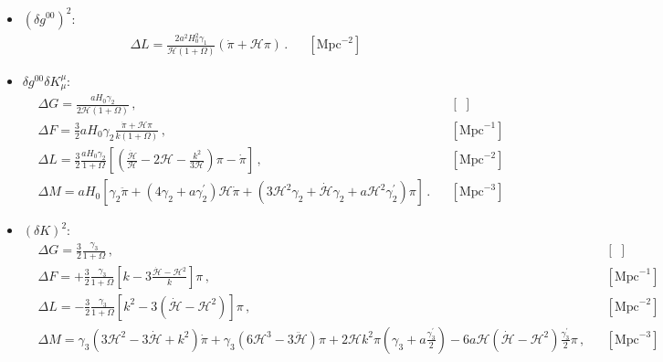 \documentclass[prd,nofootinbib,showpacs]{revtex4}
\def\l{\left}
\def\r{\right}
\def\f{\frac}
\def\hub{{\mathcal H}}
\begin{document}
{\begin{itemize}
{\begin{align}
%
\Delta X=&1 \,, \hspace{1cm} \Delta \dot{X}=0  \, , & & [\,\, , \,\,] \, \nonumber \\
%
\Delta Y=&  \frac{a\Omega^\prime}{2(1+\Omega)}  \, , & & [\,\, ] \, \nonumber \\
%
\Delta U=&1, \, & & [\,\, ] \, \nonumber \\
%
\Delta V=&\f{1}{2}\f{a\Omega'}{1+\Omega} \,, \hspace{1cm} \Delta \dot{V}=\f{a\hub}{2(1+\Omega)}\l[\Omega' +a\Omega'' -\f{a\Omega'^{\,2}}{1+\Omega} \r] \, . & & [\,\, , \text{Mpc}^{-1}] \,
\end{align}}
%
\item[] \underline{$(\delta g^{00})^2$}:\\
{\small
\begin{align}\label{Eq:ContribGamma1}
& \Delta {{ L}}= \f{2a^2H_0^2\gamma_1}{\hub \l(1 + \Omega \r)}\l(\dot{\pi}+\hub\pi\r)\, .& & [\text{Mpc}^{-2}] \,
\end{align}}
%
\item[] 
\underline{$\delta g^{00}\delta K^\mu_\mu$}:
{\small
\begin{align} \label{Eq:ContribGamma2}
&\Delta{ G}=\f{a H_0 \gamma_2}{2\hub(1+\Omega)} \, , & & [\,\,] \,\nonumber \\
%
&\Delta{ F}=\f{3}{2}aH_0\gamma_2\f{\dot{\pi}+\hub\pi}{k(1+\Omega)}\, , & &  [\text{Mpc}^{-1}] \,\nonumber\\
%
&\Delta{ L}=\f{3}{2} \f{a H_0\gamma_2}{1+\Omega}\left[\l(\f{\dot{\hub}}{\hub}-2\hub-\f{k^2}{3\hub}\r)\pi-\dot{\pi}\r] \, ,& &  [\text{Mpc}^{-2}] \,\nonumber\\
%
&\Delta{ M}= aH_0\l[\gamma_2\ddot{\pi}+\l(4\gamma_2+a\gamma_2^\prime\r)\hub\dot{\pi}+\l(3\hub^2\gamma_2+\dot{\hub}\gamma_2+a\hub^2\gamma_2^\prime\r)\pi\r]\, . & &  [\text{Mpc}^{-3}] \,
\end{align}}
%
\item[] \underline{$(\delta K)^2$}:\\
{\small
\begin{align} \label{Eq:ContribGamma3}
%
&\Delta{ G}=\f{3}{2}\f{\gamma_3}{1+\Omega}\, , & &  [\,\,]  \,\nonumber \\
%
&\Delta{ F}=+\f{3}{2}\f{\gamma_3}{1+\Omega}\l[k-3\f{\dot{\hub}-\hub^2}{k}\r]\pi \, , & &  [\text{Mpc}^{-1}] \,\nonumber\\
%
&\Delta{ L}= -\f{3}{2}\f{\gamma_3}{1+\Omega}\l[k^2-3\l(\dot{\hub}-\hub^2\r)\r]\pi \, ,& &  [\text{Mpc}^{-2}] \,\nonumber\\
%
&\Delta{ M}= \gamma_3\l(3\hub^2-3\dot{\hub}+k^2\r)\dot{\pi}+\gamma_3 \l(6\hub^3-3\ddot{\hub} \r)\pi +2\hub k^2\pi\l(\gamma_3+a\f{\gamma_3^\prime}{2}\r) -6a\hub(\dot{\hub}-\hub^2)\f{\gamma_3^\prime}{2}\pi \, , & &  [\text{Mpc}^{-3}] \,\nonumber\\

\end{align}}
\end{itemize}}
\end{document}
